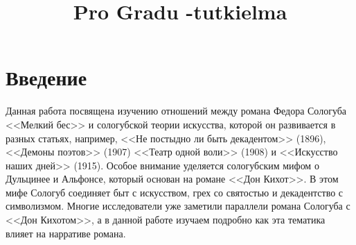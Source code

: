 \documentclass[12pt,a4paper]{article}
\title{Pro Gradu -tutkielma}
\begin{document}


\tableofcontents
\thispagestyle{empty}

\pagebreak


\section{Введение}

Данная работа посвящена изучению отношений между романа Федора Сологуба <<Мелкий бес>> и сологубской теории искусства, которой он развивается в разных статьях, например,  <<Не постыдно ли быть декадентом>> (1896), <<Демоны поэтов>> (1907) <<Театр одной воли>> (1908) и <<Искусство наших дней>> (1915). Особое внимание уделяется сологубским мифом о Дульцинее и Альфонсе, который основан на романе <<Дон Кихот>>. В этом мифе Сологуб соединяет быт с искусством, грех со святостью и декадентство с символизмом. Многие исследователи уже заметили параллели  романа Сологуба с <<Дон Кихотом>>, а в данной работе изучаем подробно как эта тематика влияет на нарративе романа.
\end{document}

